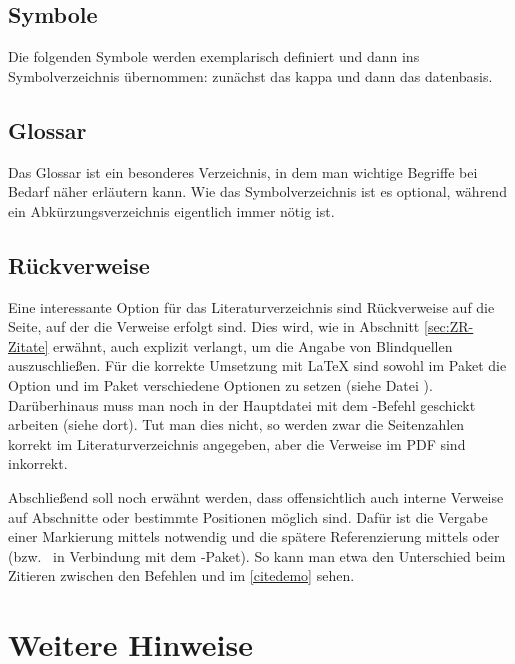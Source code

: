 \subsection{Symbole}
\label{subsec:ZR-BR-Symbole}
%
Die folgenden Symbole werden exemplarisch definiert und dann ins Symbolverzeichnis übernommen:
zunächst das \gls{kappa} und dann das \gls{datenbasis}. 
%
\subsection{Glossar}
\label{subsec:ZR-BR-Glossar}
%
Das Glossar ist ein besonderes Verzeichnis, in dem man wichtige Begriffe bei Bedarf näher erläutern kann. Wie
das Symbolverzeichnis ist es optional, während ein Abkürzungsverzeichnis eigentlich immer nötig ist. 
%
\subsection{Rückverweise}
\label{subsec:ZR-BR-Rueckverweise}
%
Eine interessante Option für das Literaturverzeichnis sind Rückverweise auf die Seite, auf der die Verweise
erfolgt sind. Dies wird, wie in Abschnitt \ref{sec:ZR-Zitate} erwähnt, auch explizit verlangt, um die
Angabe von Blindquellen auszuschließen.
Für die korrekte Umsetzung mit \LaTeX{} sind sowohl im Paket  die Option  und im
Paket  verschiedene Optionen zu setzen (siehe Datei ).
Darüberhinaus muss man noch in der Hauptdatei  mit dem
-Befehl geschickt arbeiten (siehe dort). Tut man dies nicht, so werden zwar die
Seitenzahlen korrekt im Literaturverzeichnis angegeben, aber die Verweise im PDF sind inkorrekt.
%

Abschließend soll noch erwähnt werden, dass offensichtlich auch interne Verweise auf Abschnitte oder
bestimmte Positionen möglich sind. Dafür ist die Vergabe einer Markierung mittels 
notwendig und die spätere Referenzierung mittels  oder  
(bzw.~ in Verbindung mit dem -Paket). 
So kann man etwa den Unterschied beim Zitieren zwischen den Befehlen  und 
 im \autoref{citedemo} sehen.
%
\section{Weitere Hinweise}
\label{sec:ZR-WeitereHinweise}
%
%
